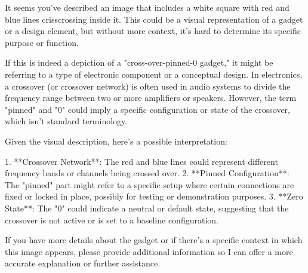 It seems you've described an image that includes a white square with red and blue lines crisscrossing inside it. This could be a visual representation of a gadget or a design element, but without more context, it's hard to determine its specific purpose or function.

If this is indeed a depiction of a "cross-over-pinned-0 gadget," it might be referring to a type of electronic component or a conceptual design. In electronics, a crossover (or crossover network) is often used in audio systems to divide the frequency range between two or more amplifiers or speakers. However, the term "pinned" and "0" could imply a specific configuration or state of the crossover, which isn't standard terminology.

Given the visual description, here’s a possible interpretation:

1. **Crossover Network**: The red and blue lines could represent different frequency bands or channels being crossed over.
2. **Pinned Configuration**: The "pinned" part might refer to a specific setup where certain connections are fixed or locked in place, possibly for testing or demonstration purposes.
3. **Zero State**: The "0" could indicate a neutral or default state, suggesting that the crossover is not active or is set to a baseline configuration.

If you have more details about the gadget or if there's a specific context in which this image appears, please provide additional information so I can offer a more accurate explanation or further assistance.